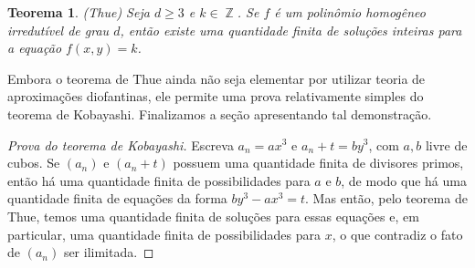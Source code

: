 \documentclass{hipatia}
\DeclareMathOperator{\Z}{\mathbb{Z}}
\newtheorem{theorem*}{Teorema}
\begin{document}
\begin{theorem*}
(Thue) Seja $d \ge 3$ e $k \in \Z$. Se $f$ é um polinômio homogêneo irredutível de grau $d$, então existe uma quantidade finita de soluções inteiras para a equação $f(x,y)=k$. 
\end{theorem*}

Embora o teorema de Thue ainda não seja elementar por utilizar teoria de aproximações diofantinas, ele permite uma prova relativamente simples do teorema de Kobayashi. Finalizamos a seção apresentando tal demonstração.

\begin{proof}[Prova do teorema de Kobayashi]
Escreva $a_n=ax^3$ e $a_n + t = by^3$, com $a, b$ livre de cubos. Se $(a_n)$ e $(a_n+t)$ possuem uma quantidade finita de divisores primos, então há uma quantidade finita de possibilidades para $a$ e $b$, de modo que há uma quantidade finita de equações da forma $by^3-ax^3=t$. Mas então, pelo teorema de Thue, temos uma quantidade finita de soluções para essas equações e, em particular, uma quantidade finita de possibilidades para $x$, o que contradiz o fato de $(a_n)$ ser ilimitada.
\end{proof}
\end{document}
